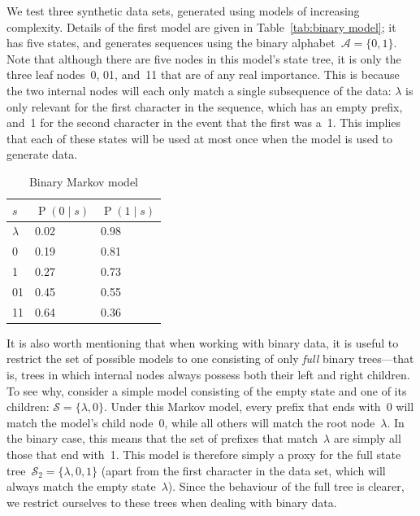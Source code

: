 \documentclass[11pt,a4paper]{article}
\newcommand\mc[1]{\mathcal{#1}}               %
\DeclareMathOperator\Pb{P}                    %
\begin{document}
We test three synthetic data sets, generated using models of increasing
complexity. Details of the first model are given in Table~\ref{tab:binary
model}; it has five states, and generates sequences using the binary
alphabet~\(\mc{A} = \{0, 1\}\). Note that although there are five nodes in this
model's state tree, it is only the three leaf nodes~0, 01, and~11 that are of
any real importance. This is because the two internal nodes will each only match
a single subsequence of the data: \(\lambda\) is only relevant for the first
character in the sequence, which has an empty prefix, and~1 for the second
character in the event that the first was a~1. This implies that each of these
states will be used at most once when the model is used to generate data.
%
\begin{table}[htbp]
\centering
\begin{tabular}{lll}
  \toprule
  \(s\)       & \(\Pb(0 \mid s)\) & \(\Pb(1 \mid s)\) \\
  \midrule
  \(\lambda\) & 0.02              & 0.98 \\
  0           & 0.19              & 0.81 \\
  1           & 0.27              & 0.73 \\
  01          & 0.45              & 0.55 \\
  11          & 0.64              & 0.36 \\
  \bottomrule
\end{tabular}
\caption{Binary Markov model}\label{tab:binary model}
\end{table}

It is also worth mentioning that when working with binary data, it is useful to
restrict the set of possible models to one consisting of only \emph{full} binary
trees---that is, trees in which internal nodes always possess both their left
and right children. To see why, consider a simple model consisting of the empty
state and one of its children: \(\mc{S} = \{\lambda, 0\}\). Under this Markov
model, every prefix that ends with~0 will match the model's child node~0, while
all others will match the root node~\(\lambda\). In the binary case, this means
that the set of prefixes that match~\(\lambda\) are simply all those that end
with~1. This model is therefore simply a proxy for the full state
tree~\(\mc{S}_2 = \{\lambda, 0, 1\}\) (apart from the first character in the
data set, which will always match the empty state~\(\lambda\)). Since the
behaviour of the full tree is clearer, we restrict ourselves to these trees when
dealing with binary data.
\end{document}
